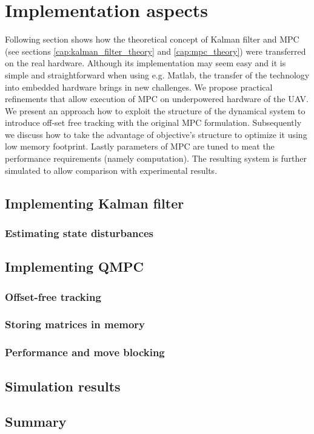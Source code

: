 \section{Implementation aspects}
\label{cap:Implementation}

Following section shows how the theoretical concept of Kalman filter and MPC (see sections \ref{cap:kalman_filter_theory} and \ref{cap:mpc_theory}) were transferred on the real hardware. Although its implementation may seem easy and it is simple and straightforward when using e.g. Matlab, the transfer of the technology into embedded hardware brings in new challenges. We propose practical refinements that allow execution of MPC on underpowered hardware of the UAV. We present an approach how to exploit the structure of the dynamical system to introduce off-set free tracking with the original MPC formulation. Subsequently we discuss how to take the advantage of objective's structure to optimize it using low memory footprint. Lastly parameters of MPC are tuned to meat the performance requirements (namely computation). The resulting system is further simulated to allow comparison with experimental results.



\subsection{Implementing Kalman filter}



\subsubsection{Estimating state disturbances}

\subsection{Implementing QMPC}

\subsubsection{Offset-free tracking}

\subsubsection{Storing matrices in memory}

\subsubsection{Performance and move blocking}
\label{cap:implementation_performance}

\subsection{Simulation results}

\subsection{Summary}